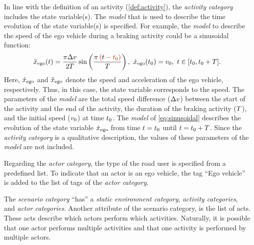 In line with the definition of an activity (\cref{def:activity}), the \textit{activity category} includes the state \cstart variable(s)\cend.
The \textit{model} that is used to describe the time evolution of the state \cstart variable(s) \cend is specified. For example, the \textit{model} to describe the speed of the ego vehicle during a braking activity could be a sinusoidal function:
\begin{equation} \label{eq:sinusoidal}
	\ddot{x}_{\mathrm{ego}}(t) = \frac{\pi \Delta v}{2T} \sin \left( \frac{\pi \color{red}\left(\color{black} t \color{red} - t_{0}\right)\color{black}}{T} \right),\ \dot{x}_{\mathrm{ego}}(t_{0}) = v_{0},\ t \in [t_{0}, t_{0}+T].
\end{equation}
Here, $\dot{x}_{\mathrm{ego}}$ and $\ddot{x}_{\mathrm{ego}}$ denote the speed and acceleration of the ego vehicle, respectively. Thus, in this case, the state \cstart variable \cend corresponds to the speed. 
The parameters of the \textit{model} are the total speed difference ($\Delta v$) between the start of the activity and the end of the activity, the duration of the braking activity ($T$), and the initial speed ($v_{0}$) at time $t_{0}$. 
The \textit{model} of \cref{eq:sinusoidal} describes the evolution of the state \cstart variable $\dot{x}_{\mathrm{ego}}$ \cend from time $t=t_{0}$ until $t=t_{0}+T$. Since the \textit{activity category} is a qualitative description, the values of these parameters of the \textit{model} are not included.

Regarding the \textit{actor category}, the type of the road user is specified from a predefined list. To indicate that an actor is an ego vehicle, the tag ``Ego vehicle'' is added to the list of tags of the \textit{actor category}.

The \textit{scenario category} ``has'' a \textit{static environment category}, \textit{activity categories}, and \textit{actor categories}. 
Another attribute of the scenario category, is the list of acts. %
These acts describe which actors perform which activities. Naturally, it is possible that one actor performs multiple activities and that one activity is performed by multiple actors.


